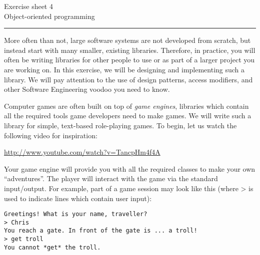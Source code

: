 \documentclass[10pt,a4paper,fleqn]{exam}
\begin{document}
\begin{center}
\Large Exercise sheet 4 \\
\LARGE Object-oriented programming 
\end{center}

\hrule

\vspace{0.5cm}

More often than not, large software systems are not developed from scratch, but instead start with many smaller, existing libraries. Therefore, in practice, you will often be writing libraries for other people to use or as part of a larger project you are working on. In this exercise, we will be designing and implementing such a library. We will pay attention to the use of design patterns, access modifiers, and other Software Engineering voodoo you need to know. 

Computer games are often built on top of \emph{game engines}, libraries which contain all the required tools game developers need to make games. We will write such a library for simple, text-based role-playing games. To begin, let us watch the following video for inspiration:

\url{http://www.youtube.com/watch?v=TancpHm4f4A}

Your game engine will provide you with all the required classes to make your own ``adventures''. The player will interact with the game via the standard input/output. For example, part of a game session may look like this (where > is used to indicate lines which contain user input):

\begin{verbatim}
Greetings! What is your name, traveller?
> Chris
You reach a gate. In front of the gate is ... a troll!
> get troll
You cannot *get* the troll.
\end{verbatim}
\end{document}
